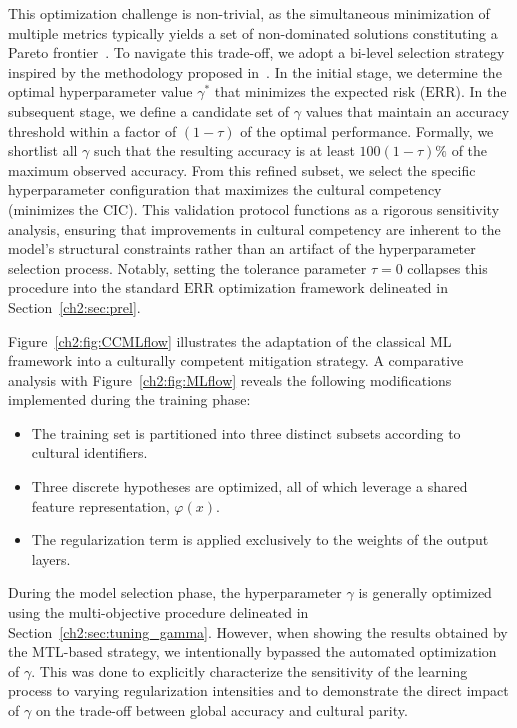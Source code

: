 This optimization challenge is non-trivial, as the simultaneous minimization of multiple metrics typically yields a set of non-dominated solutions constituting a Pareto frontier~\citep{ishizaka2013multi}. 
To navigate this trade-off, we adopt a bi-level selection strategy inspired by the methodology proposed in~\citep{OnetoC060}.
In the initial stage, we determine the optimal hyperparameter value $\gamma^*$ that minimizes the expected risk ($\text{ERR}$). In the subsequent stage, we define a candidate set of $\gamma$ values that maintain an accuracy threshold within a factor of $(1-\tau)$ of the optimal performance. 
Formally, we shortlist all $\gamma$ such that the resulting accuracy is at least $100(1-\tau)\%$ of the maximum observed accuracy. 
From this refined subset, we select the specific hyperparameter configuration that maximizes the cultural competency (minimizes the $\text{CIC}$).
This validation protocol functions as a rigorous sensitivity analysis, ensuring that improvements in cultural competency are inherent to the model's structural constraints rather than an artifact of the hyperparameter selection process. 
Notably, setting the tolerance parameter $\tau = 0$ collapses this procedure into the standard $\text{ERR}$ optimization framework delineated in Section~\ref{ch2:sec:prel}.

Figure~\ref{ch2:fig:CCMLflow} illustrates the adaptation of the classical ML framework into a culturally competent mitigation strategy. 
A comparative analysis with Figure~\ref{ch2:fig:MLflow} reveals the following modifications implemented during the training phase:
%
\begin{itemize}
\item The training set is partitioned into three distinct subsets according to cultural identifiers.
\item Three discrete hypotheses are optimized, all of which leverage a shared feature representation, $\varphi(x)$.
\item The regularization term is applied exclusively to the weights of the output layers.
\end{itemize}
%
During the model selection phase, the hyperparameter $\gamma$ is generally optimized using the multi-objective procedure delineated in Section~\ref{ch2:sec:tuning_gamma}. However, when showing the results obtained by the MTL-based strategy, we intentionally bypassed the automated optimization of $\gamma$. 
This was done to explicitly characterize the sensitivity of the learning process to varying regularization intensities and to demonstrate the direct impact of $\gamma$ on the trade-off between global accuracy and cultural parity.

